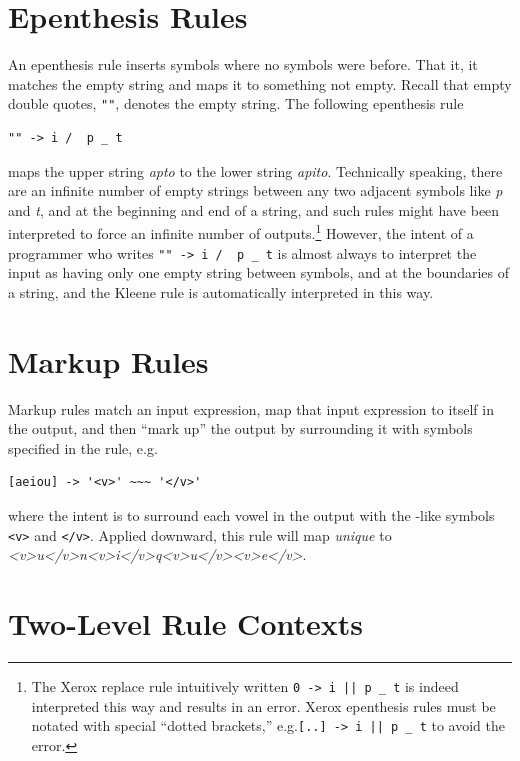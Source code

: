 \section{Epenthesis Rules}

An epenthesis rule inserts symbols where no symbols were before.  That it, it matches the empty string and maps it to
something not empty.  Recall that empty double quotes, \verb!""!, denotes the empty string.  The following epenthesis rule

\begin{Verbatim}
"" -> i /  p _ t
\end{Verbatim}

\noindent
maps the upper string \emph{apto} to the lower string \emph{apito}.  Technically speaking, there are an infinite number
of empty strings between any two adjacent symbols like \emph{p} and \emph{t}, and at the beginning and end of a string, and such rules might have been interpreted to force
an infinite number of outputs.\footnote{The Xerox replace rule intuitively written \verb!0 -> i || p _ t! is indeed interpreted this
way and results in an error.  Xerox epenthesis rules must be notated with special ``dotted brackets,'' 
e.g.\@ \verb![..] -> i || p _ t! to avoid the error.}  However, the intent of a programmer who writes \verb!"" -> i /  p _ t! is almost always to
interpret the input as having only one empty string between symbols, and at the boundaries of a string, and the Kleene rule is automatically interpreted in this way.


\section{Markup Rules}

Markup rules match an input expression, map that input expression to itself in the output, and then ``mark up'' the
output by surrounding it with symbols specified in the rule, e.g.

\begin{Verbatim}
[aeiou] -> '<v>' ~~~ '</v>'
\end{Verbatim}

\noindent
where the intent is to surround each vowel in the output with the -like symbols \verb!<v>! and \verb!</v>!.  Applied downward,
this rule will map \emph{unique} to \emph{<v>u</v>n<v>i</v>q<v>u</v><v>e</v>}.

\section{Two-Level Rule Contexts}


